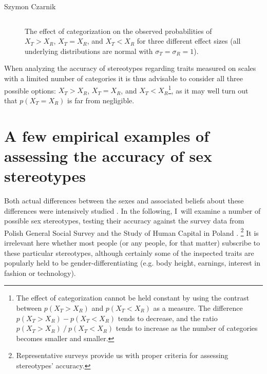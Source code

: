 \begin{artengenv}{Szymon Czarnik}
\begin{figure}[H]
\begin{small}
\begin{supertabular}{m{.32\textwidth}m{.32\textwidth}m{.32\textwidth}}
   \end{supertabular}
   \end{small}
\caption{The effect of categorization on the observed
probabilities of \(X_{T} > X_{R}\), \(X_{T} = X_{R}\), and
\(X_{T} < X_{R}\) for three different effect sizes (all underlying
distributions are normal with \(\sigma_{T} = \sigma_{R} = 1\)).}\label{fig2-czar}
\end{figure}
When analyzing the accuracy of stereotypes regarding traits measured on
scales with a limited number of categories it is thus advisable to
consider all three possible options: \(X_{T} > X_{R}\),
\(X_{T} = X_{R}\), and \(X_{T} < X_{R}\)\footnote{The effect of categorization cannot be held constant by using the contrast between $p(X_T>X_R)$ and $p(X_T<X_R)$ as a measure. The difference $p(X_T>X_R)-p(X_T<X_R)$ tends to decrease, and the ratio $p(X_T>X_R)\ /\ p(X_T<X_R)$ tends to increase as the number of categories becomes smaller and smaller.}, as it may well turn out that
\(p\left( X_{T} = X_{R} \right)\) is far from negligible.
\enlargethispage{1\baselineskip}

\section{A few empirical examples of assessing the accuracy of sex stereotypes}
Both actual differences between the sexes and associated beliefs about these differences were intensively studied
\parencites[][]{williams_measuring_1982}[][]{williams_sex_1990}[][]{costa_gender_2001}[][]{borgatta_sex_2000}[][]{buss_evolution_2003}[][]{pinker_blank_2003}. %
 In the following, I~will examine a number of possible sex stereotypes, testing their accuracy against the survey data from Polish General Social Survey 
\parencite[][]{cichomski_polskie_2013} %
 and the Study of Human Capital in Poland 
\parencites[][]{gorniak_bilans_2015}[][]{gorniak_bilans_2019}.%
\footnote{Representative surveys provide us with proper criteria for assessing stereotypes' accuracy. } It is irrelevant here whether most people (or any people, for that matter) subscribe to these particular stereotypes, although certainly some of the inspected traits are popularly held to be gender-differentiating (e.g. body height, earnings, interest in fashion or technology).


\end{artengenv}
